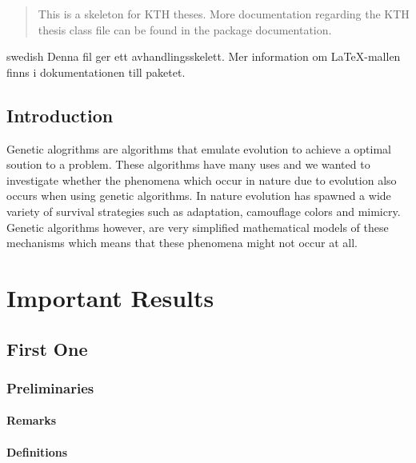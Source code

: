 \documentclass[a4paper,11pt]{kth-mag}
\title{}
\subtitle{}
\author{Namn Namnet}
\date{November 2003}
\begin{document}
\frontmatter
\pagestyle{empty}
\removepagenumbers
\maketitle
{}
\begin{abstract}
  This is a skeleton for KTH theses. More documentation
  regarding the KTH thesis class file can be found in
  the package documentation.

\end{abstract}
\clearpage
\begin{foreignabstract}{swedish}
  Denna fil ger ett avhandlingsskelett.
  Mer information om \LaTeX-mallen finns i
  dokumentationen till paketet.


\end{foreignabstract}
\clearpage
\tableofcontents*
\mainmatter
\pagestyle{newchap}
\chapter{Introduction}

Genetic alogrithms are algorithms that emulate evolution to achieve a optimal soution to a problem. 
These algorithms have many uses and we wanted to investigate whether the phenomena which occur in nature
due to evolution also occurs when using genetic algorithms. In nature evolution has spawned a wide variety
of survival strategies such as adaptation, camouflage colors and mimicry. Genetic algorithms however, are 
very simplified mathematical models of these mechanisms which means that these phenomena might not occur 
at all.

\part{Important Results}

\chapter{First One}


\section{Preliminaries}


\subsection{Remarks}


\subsection{Definitions}
\end{document}
